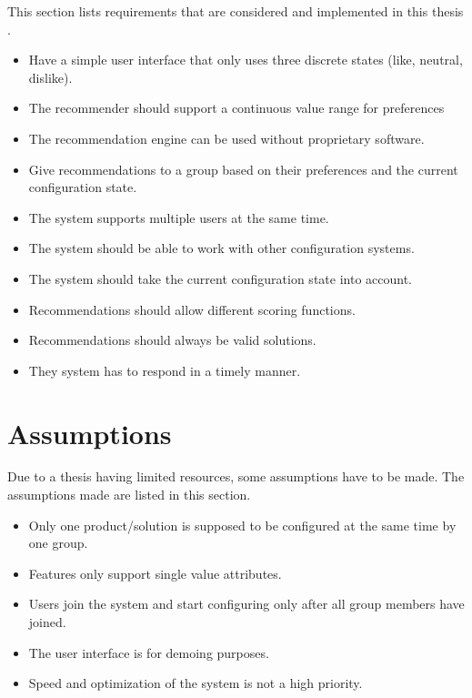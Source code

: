 This section lists requirements that are considered and implemented in this thesis . 

\begin{itemize}
    \item Have a simple user interface that only uses three discrete states (like, neutral, dislike). 
    \item The recommender should support a continuous value range for preferences
    \item The recommendation engine can be used without proprietary software.
    \item Give recommendations to a group based on their preferences and the current configuration state.
    \item The system supports multiple users at the same time.
    \item The system should be able to work with other configuration systems.
    \item The system should take the current configuration state into account.
    \item Recommendations should allow different scoring functions.
    \item Recommendations should always be valid solutions.
    \item They system has to respond in a timely manner.
\end{itemize}


\section{Assumptions}
\label{sec:Concept:Assumptions}

Due to a thesis having limited resources, some assumptions have to be made. The assumptions made are listed in this section.

\begin{itemize}
    \item Only one product/solution is supposed to be configured at the same time by one group.
    \item Features only support single value attributes.
    \item Users join the system and start configuring only after all group members have joined.
    \item The user interface is for demoing purposes.
    \item Speed and optimization of the system is not a high priority.
\end{itemize}

